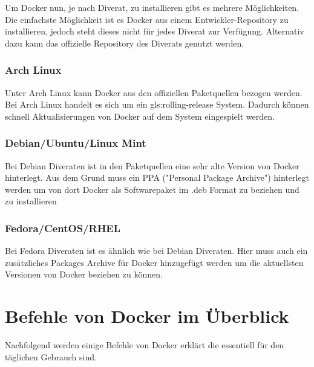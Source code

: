Um Docker nun, je nach Diverat, zu installieren gibt es mehrere Möglichkeiten.
Die einfachste Möglichkeit ist es Docker aus einem Entwickler-Repository zu
installieren, jedoch steht dieses nicht für jedes Diverat zur Verfügung.
Alternativ dazu kann das offizielle Repository des Diverats genutzt werden.

\subsubsection{Arch Linux}%
\label{sec:docker.installation.arch-linux}

Unter Arch Linux kann Docker aus den offiziellen Paketquellen bezogen werden.
Bei Arch Linux handelt es sich um ein \Gls{gls:rolling-release} System. Dadurch
können schnell Aktualisierungen von Docker auf dem System eingespielt werden.


\subsubsection{Debian/Ubuntu/Linux Mint}%
\label{sec:docker.installation.debian}

Bei Debian Diveraten ist in den Paketquellen eine sehr alte Version von Docker
hinterlegt. Aus dem Grund muss ein PPA ("Personal Package Archive") hinterlegt
werden um von dort Docker als Softwarepaket im .deb Format zu beziehen und zu
installieren


\subsubsection{Fedora/CentOS/RHEL}%
\label{sec:docker.installation.fedora}

Bei Fedora Diveraten ist es ähnlich wie bei Debian Diveraten. Hier muss auch ein
zusätzliches Packages Archive für Docker hinzugefügt werden um die aktuellsten
Versionen von Docker beziehen zu können.



\section{Befehle von Docker im Überblick}%
\label{sec:docker-befehle}
Nachfolgend werden einige Befehle von Docker erklärt die essentiell für den täglichen Gebrauch sind.

